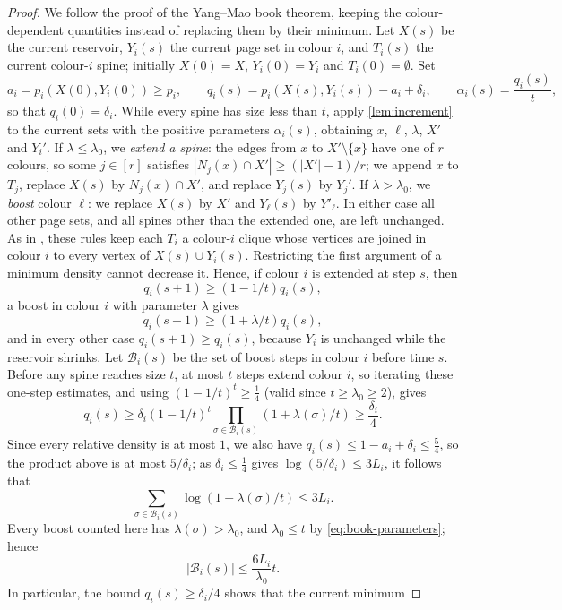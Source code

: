 \documentclass[11pt]{article}
\theoremstyle{definition}
\begin{document}
\begin{proof}
We follow the proof of the Yang--Mao book theorem, keeping the colour-dependent
quantities instead of replacing them by their minimum.  Let $X(s)$ be the
current reservoir, $Y_i(s)$ the current page set in colour $i$, and $T_i(s)$
the current colour-$i$ spine; initially $X(0)=X$, $Y_i(0)=Y_i$ and
$T_i(0)=\emptyset$.  Set
\[
 a_i=p_i(X(0),Y_i(0))\ge p_i,
 \qquad
 q_i(s)=p_i(X(s),Y_i(s))-a_i+\delta_i,
 \qquad
 \alpha_i(s)=\frac{q_i(s)}{t},
\]
so that $q_i(0)=\delta_i$.  While every spine has size less than $t$, apply
\cref{lem:increment} to the current sets with the positive parameters
$\alpha_i(s)$, obtaining $x$, $\ell$, $\lambda$, $X'$ and $Y_i'$.  If
$\lambda\le\lambda_0$, we \emph{extend a spine}: the edges from $x$ to
$X'\setminus\{x\}$ have one of $r$ colours, so some $j\in[r]$ satisfies
$|N_j(x)\cap X'|\ge(|X'|-1)/r$; we append $x$ to $T_j$, replace $X(s)$ by
$N_j(x)\cap X'$, and replace $Y_j(s)$ by $Y_j'$.  If $\lambda>\lambda_0$, we
\emph{boost} colour $\ell$: we replace $X(s)$ by $X'$ and $Y_\ell(s)$ by
$Y'_\ell$.  In either case all other page sets, and all spines other than the
extended one, are left unchanged.  As in \cite{YangMao}, these rules keep
each $T_i$ a colour-$i$ clique whose vertices are joined in colour $i$ to
every vertex of $X(s)\cup Y_i(s)$.
Restricting the first argument of a minimum density cannot decrease it.
Hence, if colour $i$ is extended at step $s$, then
\[
 q_i(s+1)\ge(1-1/t)q_i(s),
\]
a boost in colour $i$ with parameter $\lambda$ gives
\[
 q_i(s+1)\ge(1+\lambda/t)q_i(s),
\]
and in every other case $q_i(s+1)\ge q_i(s)$, because $Y_i$ is unchanged
while the reservoir shrinks.
Let $\mathcal B_i(s)$ be the set of boost steps in colour $i$ before time
$s$.  Before any spine reaches size $t$, at most $t$ steps extend colour $i$,
so iterating these one-step estimates, and using
$(1-1/t)^t\ge\tfrac14$ (valid since $t\ge\lambda_0\ge2$), gives
\[
 q_i(s)\ge
 \delta_i(1-1/t)^t
 \prod_{\sigma\in\mathcal B_i(s)}(1+\lambda(\sigma)/t)
 \ge \frac{\delta_i}{4}.
\]
Since every relative density is at most $1$, we also have
$q_i(s)\le1-a_i+\delta_i\le\tfrac54$, so the product above is at most
$5/\delta_i$; as $\delta_i\le\tfrac14$ gives $\log(5/\delta_i)\le3L_i$, it
follows that
\[
 \sum_{\sigma\in\mathcal B_i(s)}\log(1+\lambda(\sigma)/t)\le3L_i.
\]
Every boost counted here has $\lambda(\sigma)>\lambda_0$, and
$\lambda_0\le t$ by \eqref{eq:book-parameters}; hence
\[
 |\mathcal B_i(s)|\le \frac{6L_i}{\lambda_0}t.
\]
In particular, the bound $q_i(s)\ge\delta_i/4$ shows that the current minimum

\end{proof}
\end{document}
